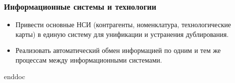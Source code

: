 \subsubsection{Информационные системы и технологии}

\begin{itemize}
\item Привести основные НСИ (контрагенты, номенклатура, технологические карты) в единую систему для унификации и устранения дублирования.
\item Реализовать автоматический обмен информацией по одним и тем же процессам между информационными системами.
\end{itemize}




 {enddoc}
